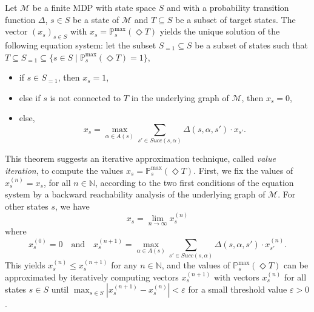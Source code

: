 \begin{theorem} \label{bellman1}
  Let $\mathcal{M}$ be a finite MDP with state space $S$ and with a probability transition function $\Delta$, $s \in S$ be a state of $\mathcal{M}$ and $T \subseteq S$ be a subset of target states. The vector $(x_s)_{s \in S}$ with $x_s = \mathbb{P}_s^{\max}(\Diamond T)$ yields the unique solution of the following equation system: let the subset $S_{=1} \subseteq S$ be a subset of states such that $T \subseteq S_{=1} \subseteq \{s \in S \; | \; \mathbb{P}^{\max}_s(\Diamond T) = 1 \}$,
  \begin{itemize}
    \item if $s \in S_{=1}$, then $x_s=1$,
    \item else if $s$ is not connected to $T$ in the underlying graph of $\mathcal{M}$, then $x_s=0$,
    \item else,
    \[ x_s = \max_{\alpha \in A(s)} \sum_{s' \in Succ(s, \alpha)} \Delta(s, \alpha, s') \cdot x_{s'}. \]
  \end{itemize}
\end{theorem}
This theorem suggests an iterative approximation technique, called \textit{value iteration}, to compute the values $x_s=\mathbb{P}^{\max}_s(\Diamond T)$. First, we fix the values of $x_s^{(n)} = x_s$, for all $n \in \mathbb{N}$, according to the two first conditions of the equation system by a backward reachability analysis of the underlying graph of $\mathcal{M}$. For other states $s$, we have
\[x_s = \lim_{n \rightarrow \infty} x_s^{(n)}\]
where
\[x_s^{(0)} = 0 \quad \text{and} \quad x_s^{(n+1)} = \max_{\alpha \in A(s)} \sum_{s' \in Succ(s, \alpha)} \Delta(s, \alpha, s') \cdot x_{s'}^{(n)}. \]
This yields $x_s^{(n)} \leq x_s^{(n+1)}$ for any $n \in \mathbb{N}$, and the values of $\mathbb{P}^{\max}_s(\Diamond T)$ can be approximated by iteratively computing vectors $x_s^{(n+1)}$
with vectors $x_s^{(n)}$ for all states $s \in S$ until $\max_{s \in S} |x_s^{(n+1)} - x_s^{(n)}| < \varepsilon$ for a small threshold value $\varepsilon > 0$.
